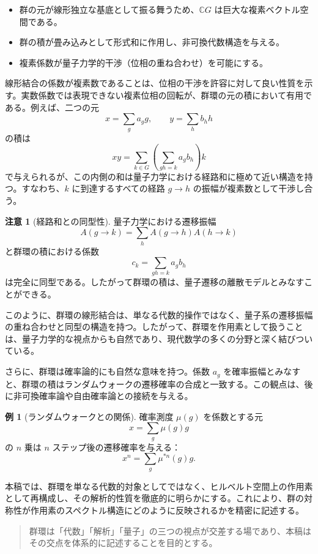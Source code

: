 \documentclass[12pt,a4paper]{ltjarticle}
\theoremstyle{definition}
\newtheorem*{remark}{注意}
\newtheorem*{example}{例}
\begin{document}
\begin{itemize}
\item 群の元が線形独立な基底として振る舞うため、$\mathbb{C}G$ は巨大な複素ベクトル空間である。
\item 群の積が畳み込みとして形式和に作用し、非可換代数構造を与える。
\item 複素係数が量子力学的干渉（位相の重ね合わせ）を可能にする。
\end{itemize}

線形結合の係数が複素数であることは、位相の干渉を許容に対して良い性質を示す。実数係数では表現できない複素位相の回転が、群環の元の積において有用である。例えば、二つの元
\[
x = \sum_{g} a_g g, \qquad y = \sum_{h} b_h h
\]
の積は
\[
xy = \sum_{k \in G} \left( \sum_{gh = k} a_g b_h \right) k
\]
で与えられるが、この内側の和は量子力学における経路和に極めて近い構造を持つ。すなわち、$k$ に到達するすべての経路 $g \to h$ の振幅が複素数として干渉し合う。

\begin{remark}[経路和との同型性]
量子力学における遷移振幅
\[
A(g\to k)=\sum_{h}A(g\to h)A(h\to k)
\]
と群環の積における係数
\[
c_k=\sum_{gh=k}a_g b_h
\]
は完全に同型である。したがって群環の積は、量子遷移の離散モデルとみなすことができる。
\end{remark}

このように、群環の線形結合は、単なる代数的操作ではなく、量子系の遷移振幅の重ね合わせと同型の構造を持つ。したがって、群環を作用素として扱うことは、量子力学的な視点からも自然であり、現代数学の多くの分野と深く結びついている。

さらに、群環は確率論的にも自然な意味を持つ。係数 $a_g$ を確率振幅とみなすと、群環の積はランダムウォークの遷移確率の合成と一致する。この観点は、後に非可換確率論や自由確率論との接続を与える。

\begin{example}[ランダムウォークとの関係]
確率測度 $\mu(g)$ を係数とする元
\[
x=\sum_{g}\mu(g)g
\]
の $n$ 乗は $n$ ステップ後の遷移確率を与える：
\[
x^n=\sum_{g}\mu^{*n}(g)g.
\]
\end{example}

本稿では、群環を単なる代数的対象としてではなく、ヒルベルト空間上の作用素として再構成し、その解析的性質を徹底的に明らかにする。これにより、群の対称性が作用素のスペクトル構造にどのように反映されるかを精密に記述する。

\begin{quote}
群環は「代数」「解析」「量子」の三つの視点が交差する場であり、本稿はその交点を体系的に記述することを目的とする。
\end{quote}
\end{document}
